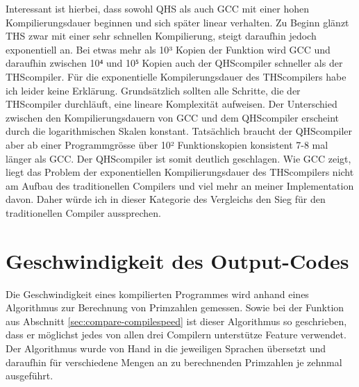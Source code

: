 Interessant ist hierbei, dass sowohl QHS als auch GCC mit einer hohen Kompilierungsdauer beginnen und sich später linear verhalten.
Zu Beginn glänzt THS zwar mit einer sehr schnellen Kompilierung, steigt daraufhin jedoch exponentiell an.
Bei etwas mehr als 10³ Kopien der Funktion wird GCC und daraufhin zwischen 10⁴ und 10⁵ Kopien auch der QHScompiler schneller als der THScompiler.
Für die exponentielle Kompilerungsdauer des THScompilers habe ich leider keine Erklärung. Grundsätzlich sollten alle Schritte, die der THScompiler durchläuft, eine lineare Komplexität aufweisen.
Der Unterschied zwischen den Kompilierungsdauern von GCC und dem QHScompiler erscheint durch die logarithmischen Skalen konstant.
Tatsächlich braucht der QHScompiler aber ab einer Programmgrösse über 10² Funktionskopien konsistent 7-8 mal länger als GCC. 
Der QHScompiler ist somit deutlich geschlagen. Wie GCC zeigt, liegt das Problem der exponentiellen Kompilierungsdauer des THScompilers nicht am Aufbau des traditionellen Compilers und viel mehr an meiner Implementation davon.
Daher würde ich in dieser Kategorie des Vergleichs den Sieg für den traditionellen Compiler aussprechen.


\section{Geschwindigkeit des Output-Codes} \label{sec:execute_speed}
Die Geschwindigkeit eines kompilierten Programmes wird anhand eines Algorithmus zur Berechnung von Primzahlen gemessen. Sowie bei der Funktion aus Abschnitt \ref{sec:compare-compilespeed} ist dieser Algorithmus so geschrieben,
dass er möglichst jedes von allen drei Compilern unterstütze Feature verwendet. Der Algorithmus wurde von Hand in die jeweiligen Sprachen übersetzt und daraufhin für verschiedene Mengen an zu berechnenden Primzahlen je zehnmal ausgeführt.

